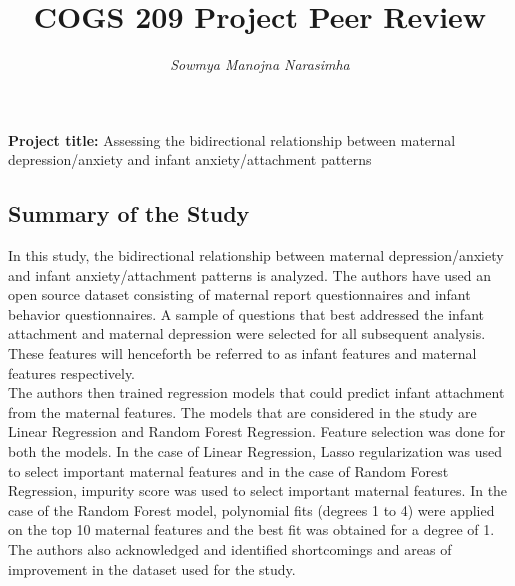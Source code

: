 \documentclass{article}
\title{\vspace{-4em}COGS 209 Project Peer Review}
\author{\textit{\vspace{-2em}Sowmya Manojna Narasimha}}
\date{}
\begin{document}
\maketitle

\noindent
\textbf{Project title:} Assessing the bidirectional relationship between maternal depression/anxiety and infant anxiety/attachment patterns

\subsection*{Summary of the Study}
In this study, the bidirectional relationship between maternal depression/anxiety and infant anxiety/attachment patterns is analyzed. The authors have used an open source dataset consisting of maternal report questionnaires and infant behavior questionnaires. A sample of questions that best addressed the infant attachment and maternal depression were selected for all subsequent analysis. These features will henceforth be referred to as infant features and maternal features respectively.\\

\noindent
The authors then trained regression models that could predict infant attachment from the maternal features. The models that are considered in the study are Linear Regression and Random Forest Regression. Feature selection was done for both the models. In the case of Linear Regression, Lasso regularization was used to select important maternal features and in the case of Random Forest Regression, impurity score was used to select important maternal features. In the case of the Random Forest model, polynomial fits (degrees 1 to 4) were applied on the top 10 maternal features and the best fit was obtained for a degree of 1. The authors also acknowledged and identified shortcomings and areas of improvement in the dataset used for the study.
\end{document}

